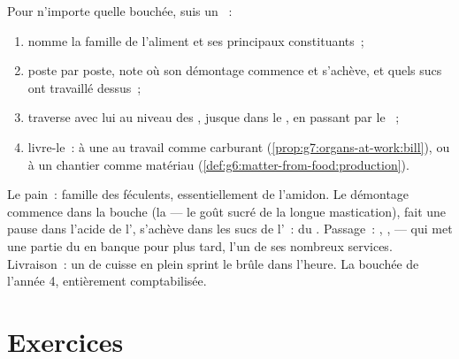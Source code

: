 \begin{method}\label{met:g7:digestion-and-nutrients:trace}
Pour n'importe quelle bouchée, suis un ~:
\begin{enumerate}
  \item nomme la famille de l'aliment et ses principaux
        constituants~;
  \item poste par poste, note où son démontage commence et
        s'achève, et quels sucs ont travaillé dessus~;
  \item traverse avec lui au niveau des , jusque dans le
        , en passant par le ~;
  \item livre-le~: à une  au travail comme carburant
        (\cref{prop:g7:organs-at-work:bill}), ou à un chantier
        comme matériau
        (\cref{def:g6:matter-from-food:production}).
\end{enumerate}
\end{method}

\begin{example}\label{ex:g7:digestion-and-nutrients:breadtrace}
Le pain~: famille des féculents, essentiellement de l'amidon. Le
démontage commence dans la bouche (la  --- le goût sucré de la
longue mastication), fait une pause dans l'acide de l',
s'achève dans les sucs de l'~: du . Passage~:
, ,  --- qui met une partie du  en banque
pour plus tard, l'un de ses nombreux services. Livraison~: un 
de cuisse en plein sprint le brûle dans l'heure. La bouchée de
l'année 4, entièrement comptabilisée.
\end{example}

\section{Exercices}


